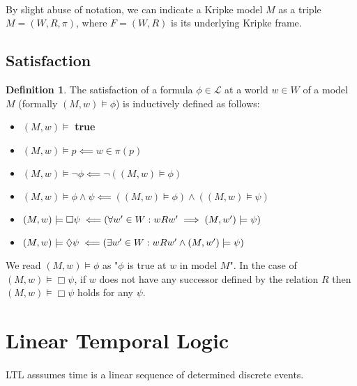 \documentclass{article}
\theoremstyle{plain}
\theoremstyle{definition}
\newtheorem{defn}[thm]{Definition} %
\begin{document}
\begin{multicols}{2}
\paragraph{} By slight abuse of notation, we can indicate a Kripke model $M$ as a triple $M = (W, R, \pi)$, where $F = (W, R)$ is its underlying Kripke frame. 

\subsection{Satisfaction}

\begin{defn}The satisfaction of a formula $\phi\in\mathcal{L}$ at a world $w\in W$ of a model $M$ (formally $(M, w) \models \phi$) is inductively defined as follows:\end{defn}

\begin{itemize}
\item $(M, w) \models $ \textbf{true}
\item $(M, w) \models p \impliedby w \in \pi(p)$
\item $(M, w) \models \lnot\phi \impliedby \lnot((M, w)\models \phi)$
\item $(M, w) \models \phi \land \psi \impliedby ((M,w) \models \phi) \land ((M, w) \models \psi)$
\item $(M, w) \models \Box\psi \impliedby\\ (\forall w' \in W: w R w' \implies (M, w') \models \psi)$
\item $(M, w) \models \Diamond\psi \impliedby\\ (\exists w' \in W: w R w' \land (M, w') \models \psi)$
\end{itemize}

\noindent We read $(M, w) \models \phi$ as "$\phi$ is true at $w$ in model $M$". In the case of $(M, w) \models \Box\psi$, if $w$ does not have any successor defined by the relation $R$ then $(M, w) \models \Box\psi$ holds for any $\psi$.

\section{Linear Temporal Logic}

\paragraph{} LTL asssumes time is a linear sequence of determined discrete events. 


\end{multicols}
\end{document}
